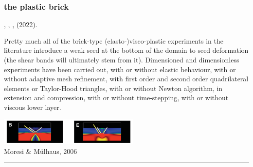 \subsubsection{the plastic brick} \label{ss:plasticbrick}

\Literature \textcite{hans03},
\textcite{moml07},
\textcite{lemm08},
\cite{kaus10,egat10,qurj09,mishin11,maie12,spmw16,gltf18,frbt19,aspectmanual}
\textcite{dakg22} (2022).

Pretty much all of the brick-type (elasto-)visco-plastic experiments in the literature
introduce a weak seed at the bottom of the domain to seed deformation (the shear bands
will ultimately stem from it). 
Dimensioned and dimensionless experiments have been carried out, with or without 
elastic behaviour, with or without adaptive mesh refinement, with first order and 
second order quadrilateral elements or Taylor-Hood triangles, with or without 
Newton algorithm, in extension and compression, with or without time-stepping,
with or without viscous lower layer. 


\begin{center}
\includegraphics[width=7cm]{images/benchmark_brick/momu06}\\
{\captionfont Moresi \& M{\"u}lhaus, 2006 \cite{momu06}}
\end{center}

\begin{center}\noindent\rule{12cm}{0.4pt}\end{center}

